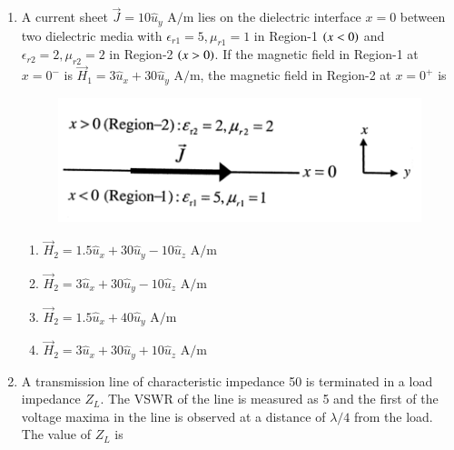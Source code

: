 \documentclass[a4paper, 11pt]{article}
\begin{document}
\begin{enumerate}
    \hfill{}

    \item A current sheet $\vec{J}=10\hat{u}_{y} \text{ A/m}$ lies on the dielectric interface $x=0$ between two dielectric media with $\epsilon_{r1}=5, \mu_{r1}=1$ in Region-1 $\left(x<0\right)$ and $\epsilon_{r2}=2, \mu_{r2}=2$ in Region-2 $\left(x>0\right)$. If the magnetic field in Region-1 at $x=0^{-}$ is $\vec{H}_{1}=3\hat{u}_{x}+30\hat{u}_{y} \text{ A/m}$, the magnetic field in Region-2 at $x=0^{+}$ is
    
    \begin{figure}[H]
        \centering
        \includegraphics[width=0.6\columnwidth]{figs/q37.png}
        \caption*{}
        \label{fig:q37}
    \end{figure}
    
    \begin{enumerate}
        \item $\vec{H}_{2}=1.5\hat{u}_{x}+30\hat{u}_{y}-10\hat{u}_{z} \text{ A/m}$
        \item $\vec{H}_{2}=3\hat{u}_{x}+30\hat{u}_{y}-10\hat{u}_{z} \text{ A/m}$
        \item $\vec{H}_{2}=1.5\hat{u}_{x}+40\hat{u}_{y} \text{ A/m}$
        \item $\vec{H}_{2}=3\hat{u}_{x}+30\hat{u}_{y}+10\hat{u}_{z} \text{ A/m}$
    \end{enumerate}
    
    \hfill{}
    \item A transmission line of characteristic impedance 50 \ohm is terminated in a load impedance $Z_{L}$. The VSWR of the line is measured as 5 and the first of the voltage maxima in the line is observed at a distance of $\lambda/4$ from the load. The value of $Z_{L}$ is
    
    \begin{enumerate}
    \end{enumerate}


\end{enumerate}
\end{document}
